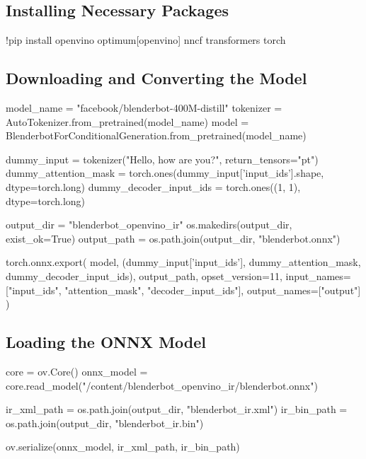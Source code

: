 \documentclass{josis}
\begin{document}
\subsection{Installing Necessary Packages}
\begin{python}
!pip install openvino optimum[openvino] nncf transformers torch
\end{python}

\subsection{Downloading and Converting the Model}
\begin{python}
model_name = "facebook/blenderbot-400M-distill"
tokenizer = AutoTokenizer.from_pretrained(model_name)
model = BlenderbotForConditionalGeneration.from_pretrained(model_name)

dummy_input = tokenizer("Hello, how are you?", return_tensors="pt")
dummy_attention_mask = torch.ones(dummy_input['input_ids'].shape, dtype=torch.long)
dummy_decoder_input_ids = torch.ones((1, 1), dtype=torch.long)

output_dir = "blenderbot_openvino_ir"
os.makedirs(output_dir, exist_ok=True)
output_path = os.path.join(output_dir, "blenderbot.onnx")

torch.onnx.export(
    model,
    (dummy_input['input_ids'], dummy_attention_mask, dummy_decoder_input_ids),
    output_path,
    opset_version=11,
    input_names=["input_ids", "attention_mask", "decoder_input_ids"],
    output_names=["output"]
)
\end{python}

\subsection{Loading the ONNX Model}
\begin{python}
core = ov.Core()
onnx_model = core.read_model("/content/blenderbot_openvino_ir/blenderbot.onnx")

ir_xml_path = os.path.join(output_dir, "blenderbot_ir.xml")
ir_bin_path = os.path.join(output_dir, "blenderbot_ir.bin")

ov.serialize(onnx_model, ir_xml_path, ir_bin_path)
\end{python}
\end{document}
